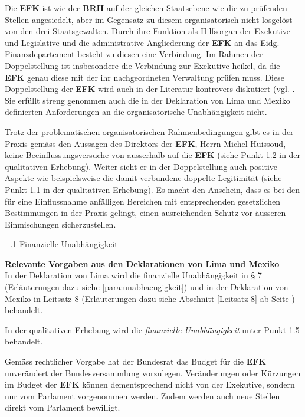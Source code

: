 \documentclass[10pt]{article}
\makeatletter
\renewcommand\paragraph{\@startsection{paragraph}{3}{0mm}{-\baselineskip}{.1\baselineskip}{\normalfont\normalsize\bfseries}}
\renewcommand\paragraph{%
\@startsection{paragraph}{3}{0mm}%
{-\baselineskip}%
{.1\baselineskip}%
{\normalfont\normalsize\bfseries}}
\makeatother
\begin{document}
Die \textbf{EFK} ist wie der \textbf{BRH} auf der gleichen Staatsebene wie die zu prüfenden Stellen angesiedelt, aber im Gegensatz zu diesem organisatorisch nicht losgelöst von den drei Staatsgewalten. Durch ihre Funktion als Hilfsorgan der Exekutive und Legislative und die administrative Angliederung der \textbf{EFK} an das Eidg. Finanzdepartement besteht zu diesen eine Verbindung. Im Rahmen der Doppelstellung ist insbesondere die Verbindung zur Exekutive heikel, da die \textbf{EFK} genau diese mit der ihr nachgeordneten Verwaltung prüfen muss. Diese Doppelstellung der \textbf{EFK} wird auch in der Literatur kontrovers diskutiert (vgl. \cite[S. 386f]{Koller2002}. Sie erfüllt streng genommen auch die in der Deklaration von Lima und Mexiko definierten Anforderungen an die organisatorische Unabhängigkeit nicht.

Trotz der problematischen organisatorischen Rahmenbedingungen gibt es in der Praxis gemäss den Aussagen des Direktors der \textbf{EFK}, Herrn Michel Huissoud, keine Beeinflussungsversuche von ausserhalb auf die \textbf{EFK} (siehe Punkt 1.2 in der qualitativen Erhebung). Weiter sieht er in der Doppelstellung auch positive Aspekte wie beispielsweise die damit verbundene doppelte Legitimität (siehe Punkt 1.1 in der qualitativen Erhebung). Es macht den Anschein, dass es bei den für eine Einflussnahme anfälligen Bereichen mit entsprechenden gesetzlichen Bestimmungen in der Praxis gelingt, einen aus­reichenden Schutz vor äusseren Einmischungen sicherzustellen.

\paragraph{Finanzielle Unabhängigkeit}\label{para:finanzielle_unabhaengigkeit}
\begin{shaded}
\textbf{Relevante Vorgaben aus den Deklarationen von Lima und Mexiko}\\
In der Deklaration von Lima wird die finanzielle Unabhängigkeit in § 7 (Erläuterungen dazu siehe \vref{para:unabhaengigkeit}) und in der Deklaration von Mexiko in Leitsatz 8 (Erläuterungen dazu siehe Abschnitt \ref{Leitsatz 8} ab Seite \pageref{Leitsatz 8}) behandelt.

\end{shaded}
In der qualitativen Erhebung wird die \textit{finanzielle Unabhängigkeit} unter Punkt 1.5 behandelt.

Gemäss rechtlicher Vorgabe hat der Bundesrat das Budget für die \textbf{EFK} unverändert der Bundesversammlung vorzulegen. Veränderungen oder Kürzungen im Budget der \textbf{EFK} können dementsprechend nicht von der Exekutive, sondern nur vom Parlament vorgenommen werden. Zudem werden auch neue Stellen direkt vom Parlament bewilligt.
\end{document}
